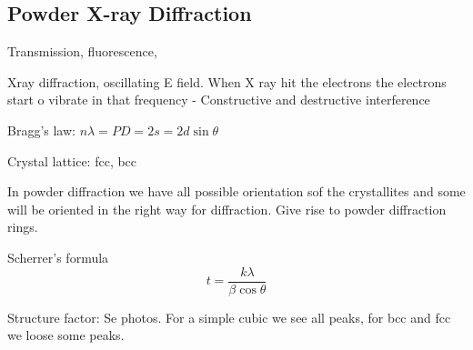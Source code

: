 \subsection{Powder X-ray Diffraction}

Transmission, fluorescence, 

Xray diffraction, oscillating E field. When X ray hit the electrons the electrons start o vibrate in that frequency
- Constructive and destructive interference 

Bragg's law: $n\lambda=PD=2s=2d\sin\theta$

Crystal lattice: fcc, bcc


In powder diffraction we have all possible orientation sof the crystallites and some will be oriented in the right way for diffraction. Give rise to powder diffraction rings. 

Scherrer's formula
\begin{equation}
    t=\frac{k\lambda}{\beta\cos\theta}
\end{equation}

Structure factor: Se photos. For a simple cubic we see all peaks, for bcc and fcc we loose some peaks. 

